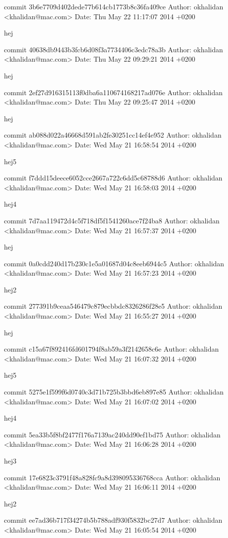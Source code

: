 \documentclass[12pt]{article}   %
\begin{document}
commit 3b6e7709d402dede77b614cb1773b8c36fa409ce
Author: okhalidan <khalidan@mac.com>
Date:   Thu May 22 11:17:07 2014 +0200

    hej

commit 40638db9443b3fcb6d08f3a7734406c3edc78a3b
Author: okhalidan <khalidan@mac.com>
Date:   Thu May 22 09:29:21 2014 +0200

    hej

commit 2ef27d916315113f0dba6a110674168217ad076e
Author: okhalidan <khalidan@mac.com>
Date:   Thu May 22 09:25:47 2014 +0200

    hej

commit ab088d022a46668d591ab2fe30251cc14ef4e952
Author: okhalidan <khalidan@mac.com>
Date:   Wed May 21 16:58:54 2014 +0200

    hej5

commit f7ddd15deece6052cce2667a722c6dd5c68788d6
Author: okhalidan <khalidan@mac.com>
Date:   Wed May 21 16:58:03 2014 +0200

    hej4

commit 7d7aa119472d4c5f718df5f1541260ace7f24ba8
Author: okhalidan <khalidan@mac.com>
Date:   Wed May 21 16:57:37 2014 +0200

    hej

commit 0a0cdd240d17b230c1e5a01687d04c8eeb6944c5
Author: okhalidan <khalidan@mac.com>
Date:   Wed May 21 16:57:23 2014 +0200

    hej2

commit 277391b9ceaa546479c879ecbbdc8326286f28e5
Author: okhalidan <khalidan@mac.com>
Date:   Wed May 21 16:55:27 2014 +0200

    hej

commit c15a67f892416fd601794f8ab59a3f2142658c6e
Author: okhalidan <khalidan@mac.com>
Date:   Wed May 21 16:07:32 2014 +0200

    hej5

commit 5275e1f599f6d0740c3d71b725b3bbd6eb897e85
Author: okhalidan <khalidan@mac.com>
Date:   Wed May 21 16:07:02 2014 +0200

    hej4

commit 5ea33b5f8bf2477f176a7139ac240dd90ef1bd75
Author: okhalidan <khalidan@mac.com>
Date:   Wed May 21 16:06:28 2014 +0200

    hej3

commit 17e6823c3791f48a828fc9a8d398095336768cca
Author: okhalidan <khalidan@mac.com>
Date:   Wed May 21 16:06:11 2014 +0200

    hej2

commit ee7ad36b717f34274b5b788adf930f5832bc27d7
Author: okhalidan <khalidan@mac.com>
Date:   Wed May 21 16:05:54 2014 +0200
\end{document}
